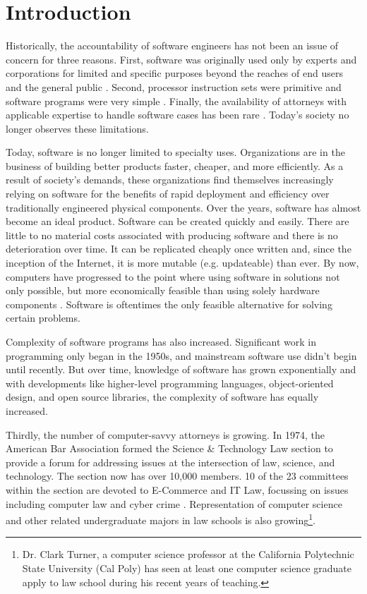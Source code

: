 \chapter{Introduction}

Historically, the accountability of software engineers has not been an issue of
concern for three reasons. First, software was originally used only by experts
and corporations for limited and specific purposes beyond the reaches of end
users and the general public \cite{Leveson95}. Second, processor instruction 
sets were primitive and software programs were very simple \cite{Storey95}. 
Finally, the availability of attorneys with applicable expertise to handle 
software cases has been rare \cite{Armour93}. Today's society no longer observes
these limitations.

Today, software is no longer limited to specialty uses. Organizations are in the
business of building better products faster, cheaper, and more efficiently. As a
result of society's demands, these organizations find themselves increasingly
relying on software for the benefits of rapid deployment and efficiency over
traditionally engineered physical components. Over the years, software has
almost become an ideal product. Software can be created quickly and easily.
There are little to no material costs associated with producing software and
there is no deterioration over time. It can be replicated cheaply once written
and, since the inception of the Internet, it is more mutable (e.g. updateable)
than ever. By now, computers have progressed to the point where using software
in solutions not only possible, but more economically feasible than using solely
hardware components \cite{Baase97}. Software is oftentimes the only feasible
alternative for solving certain problems.

Complexity of software programs has also increased. Significant work in
programming only began in the 1950s, and mainstream software use didn't begin
until recently. But over time, knowledge of software has grown exponentially
and with developments like higher-level programming languages, object-oriented
design, and open source libraries, the complexity of software has equally
increased.

Thirdly, the number of computer-savvy attorneys is growing. In 1974, the
American Bar Association formed the Science \& Technology Law section to provide
a forum for addressing issues at the intersection of law, science, and
technology. The section now has over 10,000 members. 10 of the 23 committees
within the section are devoted to E-Commerce and IT Law, focussing on issues
including computer law and cyber crime \cite{SCITECH}. Representation of
computer science and other related undergraduate majors in law schools is also
growing\footnote{Dr. Clark Turner, a computer science professor at the
California Polytechnic State University (Cal Poly) has seen at least one
computer science graduate apply to law school during his recent years of
teaching.}.

